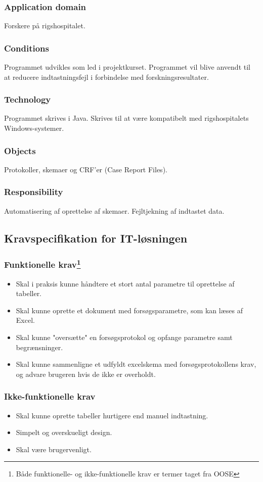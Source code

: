 \documentclass[11pt]{article}
\begin{document}
\subsubsection{Application domain}
Forskere på rigshospitalet.
\subsubsection{Conditions}
Programmet udvikles som led i projektkurset. Programmet vil blive anvendt til at reducere indtastningsfejl i forbindelse med forskningsresultater.
\subsubsection{Technology}
Programmet skrives i Java. Skrives til at være kompatibelt med rigshospitalets Windows-systemer.
\subsubsection{Objects}
Protokoller, skemaer og CRF'er (Case Report Files).
\subsubsection{Responsibility}
Automatisering af oprettelse af skemaer. Fejltjekning af indtastet data.

\subsection{Kravspecifikation for IT-løsningen}
\subsubsection{Funktionelle krav\footnote{Både funktionelle- og ikke-funktionelle krav er termer taget fra OOSE\cite{OOSE}}}
\begin{itemize}
  \item Skal i praksis kunne håndtere et stort antal parametre til oprettelse af tabeller.
  \item Skal kunne oprette et dokument med forsøgsparametre, som kan læses af Excel.
  \item Skal kunne "oversætte" en forsøgsprotokol og opfange parametre samt begrænsninger.
  \item Skal kunne sammenligne et udfyldt excelskema med forsøgsprotokollens krav, og advare brugeren hvis de ikke er overholdt.
\end{itemize}
\subsubsection{Ikke-funktionelle krav}
\begin{itemize}
  \item Skal kunne oprette tabeller hurtigere end manuel indtastning.
  \item Simpelt og overskueligt design.
  \item Skal være brugervenligt.
\end{itemize}
\pagebreak
\end{document}
